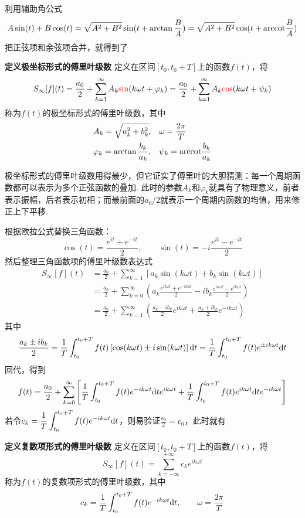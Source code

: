 \documentclass[UTF8]{ctexart}
\newcommand{\trm}[1]{{\rm #1}}
\newenvironment{definition}[1]
    {\begin{tcolorbox}[enhanced, colback=LightYellow, breakable=false, frame hidden, borderline west={1.5mm}{-2mm}{DarkGreen}]
    {\bfseries {\color{DarkGreen} 定义}\quad #1} \newline}
    {\end{tcolorbox}}
\begin{document}
利用辅助角公式
\[A\sin(t)+B\cos(t)=\sqrt{A^2+B^2}\sin(t+\arctan\frac{B}{A}) = \sqrt{A^2+B^2}\cos(t+\trm{arccot}\frac{B}{A})\]
把正弦项和余弦项合并，就得到了
\begin{definition}{极坐标形式的傅里叶级数}
    定义在区间\([t_0,t_0+T]\)上的函数\(f(t)\)，将
    \[S_{\infty}[f](t) = \frac{a_0}{2}+\sum_{k=1}^{\infty} A_k{\color{red}\sin}(k\omega t+\varphi_k) = \frac{a_0}{2}+\sum_{k=1}^{\infty} A_k{\color{red}\cos}(k\omega t+\psi_k)\]
    称为\(f(t)\)的极坐标形式的傅里叶级数，其中
    \[
        \begin{aligned}
            & A_k = \sqrt{a_k^2+b_k^2},  && \omega = \frac{2\pi}{T} \\
            & \varphi_k = \arctan\frac{b_k}{a_k}, && \psi_k = \trm{arccot}\frac{b_k}{a_k}
        \end{aligned}
    \]
\end{definition}

极坐标形式的傅里叶级数用得最少，但它证实了傅里叶的大胆猜测：每一个周期函数都可以表示为多个正弦函数的叠加. 此时的参数\(A_k\)和\(\varphi_k\)就具有了物理意义，前者表示振幅，后者表示初相；而最前面的\(a_0/2\)就表示一个周期内函数的均值，用来修正上下平移.

\vspace{1cm}

根据欧拉公式替换三角函数：
\[ \cos(t) = \frac{e^{it}+e^{-it}}{2}, \qquad \sin(t) = -i\frac{e^{it}-e^{-it}}{2} \]
然后整理三角函数项的傅里叶级数表达式
\begin{align*}
    S_{\infty}[f](t) &= \frac{a_0}{2}+\sum_{k=1}^{\infty} \left[a_k\sin(k\omega t)+b_k\sin(k\omega t)\right] \\
    &= \frac{a_0}{2} + \sum_{k=0}^{\infty}\left(a_k\frac{e^{ik\omega t}+e^{-ik\omega t}}{2}-ib_k\frac{e^{ik\omega t}-e^{ik\omega t}}{2} \right) \\
    &= \frac{a_0}{2}+\sum_{k=1}^{\infty}\left( \frac{a_k-ib_k}{2}e^{ik\omega t}+\frac{a_k+ib_k}{2}e^{-ik\omega t}\right)
\end{align*}
其中
\[\frac{a_k \pm ib_k}{2} = \frac{1}{T}\int_{t_0}^{t_0+T}f(t)\left[\cos(k\omega t) \pm i\sin(k\omega t) \right] \trm{d}t = \frac{1}{T}\int_{t_0}^{t_0+T}f(t)e^{\pm ik\omega t}\trm{d}t\]
回代，得到
\[f(t) = \frac{a_0}{2} + \sum_{k=0}^{\infty}\left[ \frac{1}{T} \int_{t_0}^{t_0+T}f(t)e^{-ik\omega t}\trm{d}te^{ik\omega t}+ \frac{1}{T}\int_{t_0}^{t_0+T}f(t)e^{ik\omega t}\trm{d}te^{-ik\omega t}\right]\]
若令\(\displaystyle{c_k = \frac{1}{T} \int_{t_0}^{t_0+T}f(t)e^{-ik\omega t}\trm{d}t}\)，则易验证\(\displaystyle{\frac{a_0}{2} = c_0}\)，此时就有
\begin{definition}{复数项形式的傅里叶级数}
    定义在区间\([t_0,t_0+T]\)上的函数\(f(t)\)，将
    \[S_{\infty}[f](t) = \sum_{k=-\infty}^{+\infty}c_ke^{ik\omega t}\]
    称为\(f(t)\)的复数项形式的傅里叶级数，其中
    \[c_k = \frac{1}{T} \int_{t_0}^{t_0+T}f(t)e^{-ik\omega t}\trm{d}t, \qquad \omega=\frac{2\pi}{T}\]
\end{definition}
\end{document}
